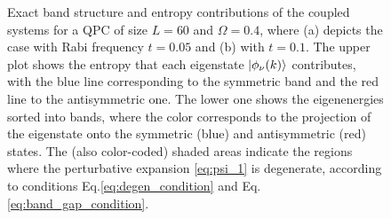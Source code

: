 \documentclass{article}
\begin{document}
\begin{figure}[h]
\begin{subfigure}[b]{0.43\textwidth}
        \caption{ }
    \end{subfigure}
    \caption{Exact band structure and entropy contributions of the coupled systems for a QPC of size $L=60$ and $\Omega=0.4$, where (a) depicts the case with Rabi frequency $t=0.05$ and (b) with $t=0.1$. The upper plot shows the entropy that each eigenstate $\ket{\phi_\nu (k)}$ contributes, with the blue line corresponding to the symmetric band and the red line to the antisymmetric one. The lower one shows the eigenenergies sorted into bands, where the color corresponds to the projection of the eigenstate onto the symmetric (blue) and antisymmetric (red) states. The (also color-coded) shaded areas indicate the regions where the perturbative expansion \eqref{eq:psi_1} is degenerate, according to conditions Eq.\eqref{eq:degen_condition} and Eq.\eqref{eq:band_gap_condition}.}
    \label{fig:energy_bands}
\end{figure}
\end{document}
